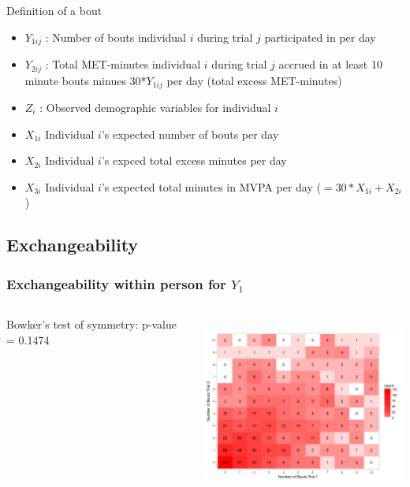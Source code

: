 \documentclass[handout]{beamer}\usepackage[]{graphicx}\usepackage[]{color}
\begin{document}
\begin{frame}

Definition of a bout \\

\begin{itemize}
\item
$Y_{1ij}$ : Number of bouts individual $i$ during trial $j$ participated in per day
\item
$Y_{2ij}$ : Total MET-minutes individual $i$ during trial $j$ accrued in at least 10 minute bouts minues 30*$Y_{1ij}$ per day (total excess MET-minutes)
\item
$Z_i$ : Observed demographic variables for individual $i$
\item
$X_{1i}$ Individual $i$'s expected number of bouts per day
\item
$X_{2i}$ Individual $i$'s expced total excess minutes per day
\item
$X_{3i}$ Individual $i$'s expected total minutes in MVPA per day ($= 30*X_{1i}+X_{2i}$)
\end{itemize}

\end{frame}

\subsection{Exchangeability}

\begin{frame}
\frametitle{Exchangeability within person for $Y_1$}
\begin{columns}
\begin{column}{0.3\textwidth}
Bowker's test of symmetry: p-value = 0.1474
\end{column}
\begin{column}{0.7\textwidth}
\includegraphics[height=6cm, width=8cm]{y1exch}
\end{column}
\end{columns}

\end{frame}
\end{document}

